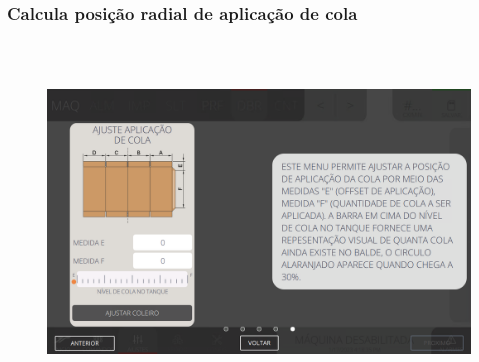\newpage
\thispagestyle{fancy}
\vspace*{40 pt}
\subsubsection{\small{Calcula posição radial de aplicação de cola}}\label{telaAjustesDobraCalculaPosicaoRadialAplicacaoCola}
\vspace*{\fill}
\begin{figure}[h]
  \centering
  \includegraphics[width=576px,height=360px]{src/imagesFlexo/07-fold/settings/e-5.png}
\end{figure}
\vspace*{\fill}

\newpage
\thispagestyle{fancy}
\vspace*{40 pt}
